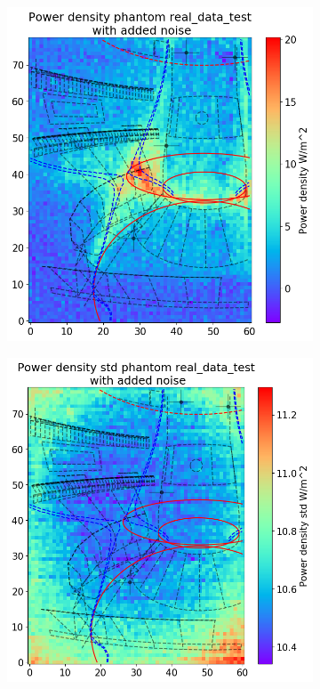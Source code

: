 \begin{figure}[!ht]
     \begin{subfigure}{0.45\linewidth}
         \centering
         \includegraphics[trim={0 0 0 45},clip,width=\textwidth]{Chapters/chapter2/figs/inversion_comparison_foil_power_real_data_test.png}
         \caption{}
         \label{fig:real_phantom1a}
     \end{subfigure}
     \hfill
     \begin{subfigure}{0.45\linewidth}
         \centering
         \includegraphics[trim={0 0 0 45},clip,width=\textwidth]{Chapters/chapter2/figs/inversion_comparison_foil_power_std_real_data_test.png}

\end{subfigure}
\end{figure}
